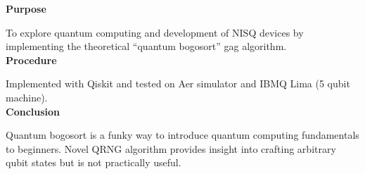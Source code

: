 \documentclass{article}
\begin{document}
\begin{multicols}{3}
    \centering
    \textbf{Purpose} \\
    \raggedright To explore quantum computing and development of NISQ devices by implementing the theoretical ``quantum bogosort'' gag algorithm. \\
    \columnbreak
    \centering
    \textbf{Procedure} \\
    \raggedright Implemented with Qiskit and tested on Aer simulator and IBMQ Lima (5 qubit machine). \\
    \columnbreak
    \centering
    \textbf{Conclusion} \\
    \raggedright Quantum bogosort is a funky way to introduce quantum computing fundamentals to beginners. Novel QRNG algorithm provides insight into crafting arbitrary qubit states but is not practically useful.
\end{multicols}
\end{document}
